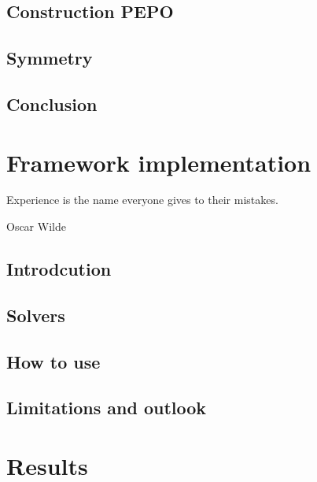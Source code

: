 \documentclass{book}
\newcounter{a}
\newcounter{b}
\begin{document}
\section{Construction PEPO}\label{H4_pepo_cons}


\section{Symmetry}


\section{Conclusion}


\chapter{Framework implementation}\label{chap5}



\epigraph{Experience is the name everyone gives to their mistakes.}{Oscar Wilde}

\section{Introdcution}


\section{Solvers} \label{sec:framework_impl}


\section{How to use}\label{sec:H5:source_code}


\section{Limitations and outlook}


\chapter{Results} \label{chap:results}
\end{document}
